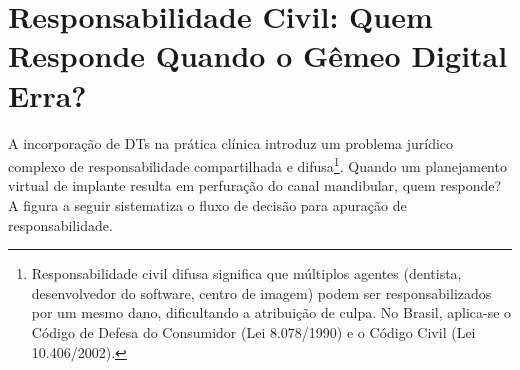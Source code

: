 \section{Responsabilidade Civil: Quem Responde Quando o Gêmeo Digital Erra?}

A incorporação de DTs na prática clínica introduz um problema jurídico complexo de responsabilidade compartilhada e difusa\footnote[8]{Responsabilidade civil difusa significa que múltiplos agentes (dentista, desenvolvedor do software, centro de imagem) podem ser responsabilizados por um mesmo dano, dificultando a atribuição de culpa. No Brasil, aplica-se o Código de Defesa do Consumidor (Lei 8.078/1990) e o Código Civil (Lei 10.406/2002).}. Quando um planejamento virtual de implante resulta em perfuração do canal mandibular, quem responde? A figura a seguir sistematiza o fluxo de decisão para apuração de responsabilidade.


